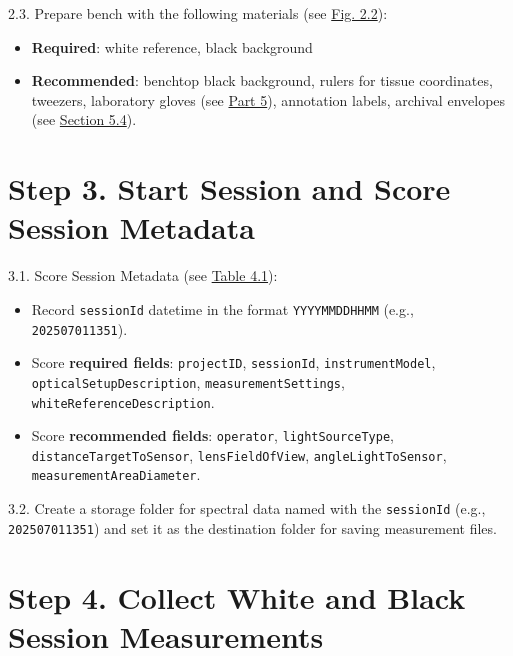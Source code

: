 \documentclass[
  letterpaper,
  DIV=11,
  numbers=noendperiod]{scrreprt}
\providecommand{\tightlist}{%
  \setlength{\itemsep}{0pt}\setlength{\parskip}{0pt}}
\begin{document}
2.3. Prepare bench with the following materials (see
\hyperref[f2-2]{Fig. 2.2}):

\begin{itemize}
\tightlist
\item
  \textbf{Required}: white reference, black background\\
\item
  \textbf{Recommended}: benchtop black background, rulers for tissue
  coordinates, tweezers, laboratory gloves (see
  \href{part5-instrumentation.qmd}{Part 5}), annotation labels, archival
  envelopes (see \hyperref[specimen-and-tissue-annotation]{Section
  5.4}).
\end{itemize}

\section{Step 3. Start Session and Score Session
Metadata}\label{step-3.-start-session-and-score-session-metadata}

3.1. Score Session Metadata (see \hyperref[tbl-4-1]{Table 4.1}):

\begin{itemize}
\tightlist
\item
  Record \texttt{sessionId} datetime in the format \texttt{YYYYMMDDHHMM}
  (e.g., \texttt{202507011351}).\\
\item
  Score \textbf{required fields}: \texttt{projectID},
  \texttt{sessionId}, \texttt{instrumentModel},
  \texttt{opticalSetupDescription}, \texttt{measurementSettings},
  \texttt{whiteReferenceDescription}.\\
\item
  Score \textbf{recommended fields}: \texttt{operator},
  \texttt{lightSourceType}, \texttt{distanceTargetToSensor},
  \texttt{lensFieldOfView}, \texttt{angleLightToSensor},
  \texttt{measurementAreaDiameter}.
\end{itemize}

3.2. Create a storage folder for spectral data named with the
\texttt{sessionId} (e.g., \texttt{202507011351}) and set it as the
destination folder for saving measurement files.

\section{Step 4. Collect White and Black Session
Measurements}\label{step-4.-collect-white-and-black-session-measurements}
\end{document}
